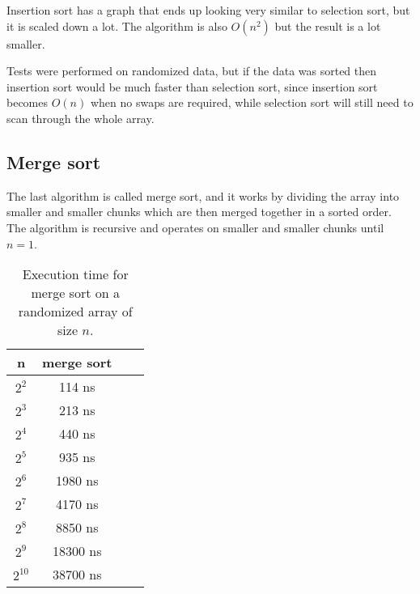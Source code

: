 \documentclass[a4paper,11pt]{article}
\begin{document}
Insertion sort has a graph that ends up looking very similar to selection sort, but it is scaled down a lot. The algorithm is also $O(n^2)$ but the result is a lot smaller.

Tests were performed on randomized data, but if the data was sorted then insertion sort would be much faster than selection sort, since insertion sort becomes $O(n)$ when no swaps are required, while selection sort will still need to scan through the whole array.

\subsection*{Merge sort}

The last algorithm is called merge sort, and it works by dividing the array into smaller and smaller chunks which are then merged together in a sorted order. The algorithm is recursive and operates on smaller and smaller chunks until $n=1$.

\begin{table}[H]
\centering
\begin{tabular}{|c|c|c|c|}
\hline
\textbf{n} & \textbf{merge sort} \\
\hline
	$2^{2}$ & 114 ns \\
	$2^{3}$ & 213 ns \\
	$2^{4}$ & 440 ns \\
	$2^{5}$ & 935 ns \\
	$2^{6}$ & 1980 ns \\
	$2^{7}$ & 4170 ns \\
	$2^{8}$ & 8850 ns \\
	$2^{9}$ & 18300 ns \\
	$2^{10}$ & 38700 ns \\
\hline
\end{tabular}
\caption{Execution time for merge sort on a randomized array of size $n$.}
\label{tab:table3}
\end{table}

\begin{table}[H]
\centering
{}
\end{table}
\end{document}
